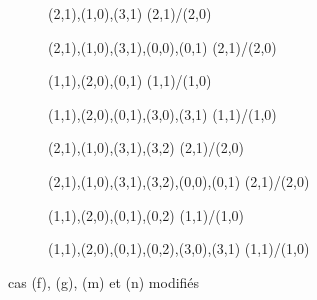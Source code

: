 \begin{figure}[h!]
  \centering
  \begin{subfigure}[b]{0.20\textwidth}
    \resizebox{\linewidth}{!} {
       {{(2,1),(1,0),(3,1)}}             {{{(2,1)/(2,0)}}}
    }
  \end{subfigure}
  \begin{subfigure}[b]{0.20\textwidth}
    \resizebox{\linewidth}{!} {
       {{(2,1),(1,0),(3,1),(0,0),(0,1)}}             {{{(2,1)/(2,0)}}}
    }
  \end{subfigure}
  \begin{subfigure}[b]{0.20\textwidth}
    \resizebox{\linewidth}{!} {
       {{(1,1),(2,0),(0,1)}}             {{{(1,1)/(1,0)}}}
    }
  \end{subfigure}
  \begin{subfigure}[b]{0.20\textwidth}
    \resizebox{\linewidth}{!} {
       {{(1,1),(2,0),(0,1),(3,0),(3,1)}}             {{{(1,1)/(1,0)}}}
    }
  \end{subfigure}
  \begin{subfigure}[b]{0.20\textwidth}
    \resizebox{\linewidth}{!} {
       {{(2,1),(1,0),(3,1),(3,2)}}       {{{(2,1)/(2,0)}}}
    }
  \end{subfigure}
  \begin{subfigure}[b]{0.20\textwidth}
    \resizebox{\linewidth}{!} {
       {{(2,1),(1,0),(3,1),(3,2),(0,0),(0,1)}}       {{{(2,1)/(2,0)}}}
    }
  \end{subfigure}
  \begin{subfigure}[b]{0.20\textwidth}
    \resizebox{\linewidth}{!} {
       {{(1,1),(2,0),(0,1),(0,2)}}       {{{(1,1)/(1,0)}}}
    }
  \end{subfigure}
  \begin{subfigure}[b]{0.20\textwidth}
    \resizebox{\linewidth}{!} {
       {{(1,1),(2,0),(0,1),(0,2),(3,0),(3,1)}}       {{{(1,1)/(1,0)}}}
    }
  \end{subfigure}
  \caption{cas (f), (g), (m) et (n) modifiés}
  \label{fig:fgmn_modif}
\end{figure}

